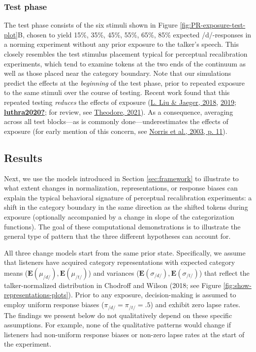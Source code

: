 \documentclass[
  11pt,
  man,floatsintext]{apa6}
\begin{document}
\hypertarget{test-phase}{%
\subsubsection{Test phase}\label{test-phase}}

The test phase consists of the six stimuli shown in Figure \ref{fig:PR-exposure-test-plot}B, chosen to yield 15\%, 35\%, 45\%, 55\%, 65\%, 85\% expected /d/-responses in a norming experiment without any prior exposure to the talker's speech. This closely resembles the test stimulus placement typical for perceptual recalibration experiments, which tend to examine tokens at the two ends of the continuum as well as those placed near the category boundary. Note that our simulations predict the effects at the \emph{beginning} of the test phase, prior to repeated exposure to the same stimuli over the course of testing. Recent work found that this repeated testing \emph{reduces} the effects of exposure (\protect\hyperlink{ref-liu-jaeger2018}{L. Liu \& Jaeger, 2018}, \protect\hyperlink{ref-liu-jaeger2019}{2019}; \protect\hyperlink{ref-luthra2020}{\textbf{luthra2020?}}; for review, see \protect\hyperlink{ref-theodore2021}{Theodore, 2021}). As a consequence, averaging across all test blocks---as is commonly done---underestimates the effects of exposure (for early mention of this concern, see \protect\hyperlink{ref-norris2003}{Norris et al., 2003, p. 11}).

\hypertarget{results}{%
\subsection{Results}\label{results}}

Next, we use the models introduced in Section \ref{sec:framework} to illustrate to what extent changes in normalization, representations, or response biases can explain the typical behavioral signature of perceptual recalibration experiments: a shift in the category boundary in the same direction as the shifted tokens during exposure (optionally accompanied by a change in slope of the categorization functions). The goal of these computational demonstrations is to illustrate the general type of pattern that the three different hypotheses can account for.

All three change models start from the same prior state. Specifically, we assume that listeners have acquired category representations with expected category means (\(\mathbf{E}(\mu_{/d/}), \mathbf{E}(\mu_{/t/})\)) and variances (\(\mathbf{E}(\sigma_{/d/}), \mathbf{E}(\sigma_{/t/})\)) that reflect the talker-normalized distribution in Chodroff and Wilson (2018; see Figure \ref{fig:show-representations-plots}). Prior to any exposure, decision-making is assumed to employ uniform response biases (\(\pi_{/d/}=\pi_{/t/}=.5\)) and exhibit zero lapse rates. The findings we present below do not qualitatively depend on these specific assumptions. For example, none of the qualitative patterns would change if listeners had non-uniform response biases or non-zero lapse rates at the start of the experiment.
\end{document}
